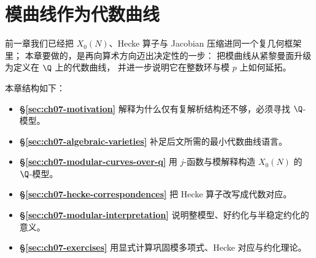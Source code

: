 \chapter{模曲线作为代数曲线}
\label{ch:algebraic-curves}

前一章我们已经把 $X_0(N)$、Hecke 算子与 Jacobian 压缩进同一个复几何框架里；
本章要做的，是再向算术方向迈出决定性的一步：
把模曲线从紧黎曼面升级为定义在 $\Q$ 上的代数曲线，
并进一步说明它在整数环与模 $p$ 上如何延拓。

本章结构如下：
\begin{itemize}
  \item \textbf{§\ref{sec:ch07-motivation}} 解释为什么仅有复解析结构还不够，必须寻找 $\Q$-模型。
  \item \textbf{§\ref{sec:ch07-algebraic-varieties}} 补足后文所需的最小代数曲线语言。
  \item \textbf{§\ref{sec:ch07-modular-curves-over-q}} 用 $j$-函数与模解释构造 $X_0(N)$ 的 $\Q$-模型。
  \item \textbf{§\ref{sec:ch07-hecke-correspondences}} 把 Hecke 算子改写成代数对应。
  \item \textbf{§\ref{sec:ch07-modular-interpretation}} 说明整模型、好约化与半稳定约化的意义。
  \item \textbf{§\ref{sec:ch07-exercises}} 用显式计算巩固模多项式、Hecke 对应与约化理论。
\end{itemize}







